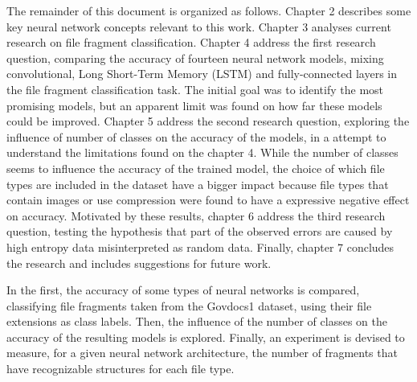 
The remainder of this document is organized as follows.
    Chapter 2 describes some key neural network concepts relevant to this work. 
    Chapter 3 analyses current research on file fragment classification. 
    Chapter 4 address the first research question, comparing the accuracy of fourteen neural network models, mixing convolutional, Long Short-Term Memory (LSTM) and fully-connected layers in the file fragment classification task. The initial goal was to identify the most promising models, but an apparent limit was found on how far these models could be improved.
    Chapter 5 address the second research question, exploring the influence of number of classes on the accuracy of the models, in a attempt to understand the limitations found on the chapter 4. While the number of classes seems to influence the accuracy of the trained model, the choice of which file types are included in the dataset have a bigger impact because file types that contain images or use compression were found to have a expressive negative effect on accuracy.
    Motivated by these results, chapter 6 address the third research question, testing the hypothesis that part of the observed errors are caused by high entropy data misinterpreted as random data. 
    Finally, chapter 7 concludes the research and includes suggestions for future work.


    In the first, the accuracy of some types of neural networks is compared, classifying file fragments taken from the Govdocs1 dataset\cite{garfinkel_bringing_2009}, using their file extensions as class labels.
    Then, the influence of the number of classes on the accuracy of the resulting models is explored. Finally, an experiment is devised to measure, for a given neural network architecture, the number of fragments that have recognizable structures for each file type.